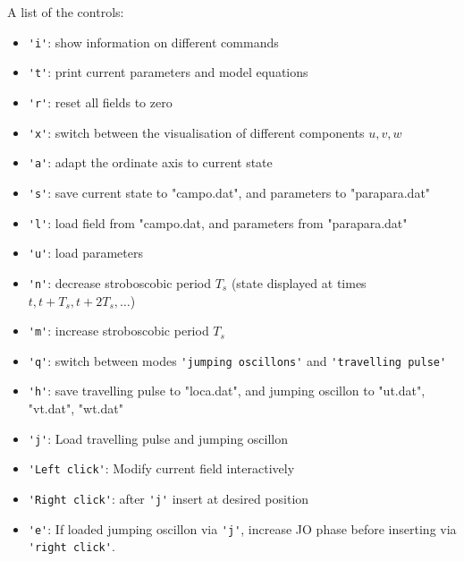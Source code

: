 \documentclass{article}
\begin{document}
A list of the controls:
\begin{itemize}
\item \verb!'i'!: show information on different commands
\item \verb!'t'!: print current parameters and model equations
\item \verb!'r'!: reset all fields to zero
\item \verb!'x'!: switch between the visualisation of different components $u,v,w$ 
\item \verb!'a'!: adapt the ordinate axis to current state 
\item \verb!'s'!: save current state to "campo.dat", and parameters to "parapara.dat"
\item \verb!'l'!: load field from "campo.dat, and parameters from "parapara.dat"
\item \verb!'u'!: load parameters
\item \verb!'n'!: decrease stroboscobic period $T_s$ (state displayed at times $t, t+T_s, t +2T_s,\dots$)
\item \verb!'m'!:  increase stroboscobic period $T_s$
\item \verb!'q'!:  switch between modes \verb!'jumping oscillons'! and  \verb!'travelling pulse'!
\item \verb!'h'!: save travelling pulse to "loca.dat", and jumping oscillon to "ut.dat", "vt.dat", "wt.dat"
\item \verb!'j'!: Load travelling pulse and jumping oscillon
\item \verb!'Left click'!: Modify current field interactively
\item \verb!'Right click'!: after \verb!'j'! insert at desired position
\item \verb!'e'!: If loaded jumping oscillon via \verb!'j'!, increase JO phase before inserting via \verb!'right click'!. 

\end{itemize}
\end{document}
